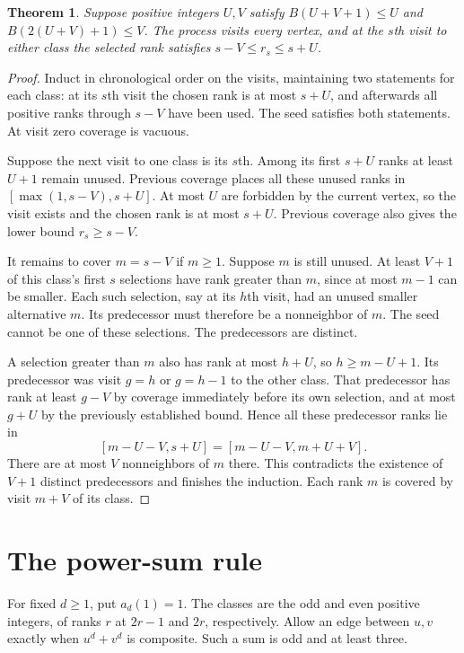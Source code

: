 \documentclass[11pt,letterpaper]{article}
\newtheorem{theorem}{Theorem}
\begin{document}
\begin{theorem}\label{thm:path}
Suppose positive integers $U,V$ satisfy $B(U+V+1)\le U$ and $B(2(U+V)+1)\le V$. The process visits every vertex, and at the $s$th visit to either class the selected rank satisfies $s-V\le r_s\le s+U$.
\end{theorem}
\begin{proof}
Induct in chronological order on the visits, maintaining two statements for each class: at its $s$th visit the chosen rank is at most $s+U$, and afterwards all positive ranks through $s-V$ have been used. The seed satisfies both statements. At visit zero coverage is vacuous.

Suppose the next visit to one class is its $s$th. Among its first $s+U$ ranks at least $U+1$ remain unused. Previous coverage places all these unused ranks in $[\max(1,s-V),s+U]$. At most $U$ are forbidden by the current vertex, so the visit exists and the chosen rank is at most $s+U$. Previous coverage also gives the lower bound $r_s\ge s-V$.

It remains to cover $m=s-V$ if $m\ge1$. Suppose $m$ is still unused. At least $V+1$ of this class's first $s$ selections have rank greater than $m$, since at most $m-1$ can be smaller. Each such selection, say at its $h$th visit, had an unused smaller alternative $m$. Its predecessor must therefore be a nonneighbor of $m$. The seed cannot be one of these selections. The predecessors are distinct.

A selection greater than $m$ also has rank at most $h+U$, so $h\ge m-U+1$. Its predecessor was visit $g=h$ or $g=h-1$ to the other class. That predecessor has rank at least $g-V$ by coverage immediately before its own selection, and at most $g+U$ by the previously established bound. Hence all these predecessor ranks lie in
\[
 [m-U-V,s+U]=[m-U-V,m+U+V].
\]
There are at most $V$ nonneighbors of $m$ there. This contradicts the existence of $V+1$ distinct predecessors and finishes the induction. Each rank $m$ is covered by visit $m+V$ of its class.
\end{proof}

\section{The power-sum rule}
For fixed $d\ge1$, put $a_d(1)=1$. The classes are the odd and even positive integers, of ranks $r$ at $2r-1$ and $2r$, respectively. Allow an edge between $u,v$ exactly when $u^d+v^d$ is composite. Such a sum is odd and at least three.
\end{document}
